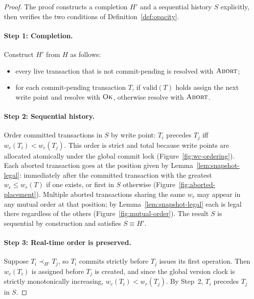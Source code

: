 \begin{proof}
  The proof constructs a completion $H'$ and a sequential history $S$
  explicitly, then verifies the two conditions of Definition~\ref{def:opacity}.

  \paragraph{Step 1: Completion.}
  Construct $H'$ from $H$ as follows:
  \begin{itemize}
    \item every live transaction that is not commit-pending is resolved with
          $\textsc{Abort}$;
    \item for each commit-pending transaction $T$, if $\text{valid}(T)$ holds
          assign the next write point and resolve with $\textsc{Ok}$,
          otherwise resolve with $\textsc{Abort}$.
  \end{itemize}

  \paragraph{Step 2: Sequential history.}
  Order committed transactions in $S$ by write point: $T_i$ precedes $T_j$
  iff $w_c(T_i) < w_c(T_j)$. This order is strict and total because write
  points are allocated atomically under the global commit lock
  (Figure~\ref{fig:wc-ordering}). Each aborted transaction goes at the
  position given by Lemma~\ref{lem:snapshot-legal}: immediately after the
  committed transaction with the greatest $w_c \leq w_r(T)$ if one exists, or
  first in $S$ otherwise (Figure~\ref{fig:aborted-placement}). Multiple
  aborted transactions sharing the same $w_r$ may appear in any mutual order
  at that position; by Lemma~\ref{lem:snapshot-legal} each is legal there
  regardless of the others (Figure~\ref{fig:mutual-order}). The result $S$ is
  sequential by construction and satisfies $S \equiv H'$.

  \paragraph{Step 3: Real-time order is preserved.}
  Suppose $T_i \prec_{H'} T_j$, so $T_i$ commits strictly before $T_j$ issues
  its first operation. Then $w_c(T_i)$ is assigned before $T_j$ is created,
  and since the global version clock is strictly monotonically increasing,
  $w_c(T_i) < w_r(T_j)$. By Step~2, $T_i$ precedes $T_j$ in $S$.


\end{proof}
